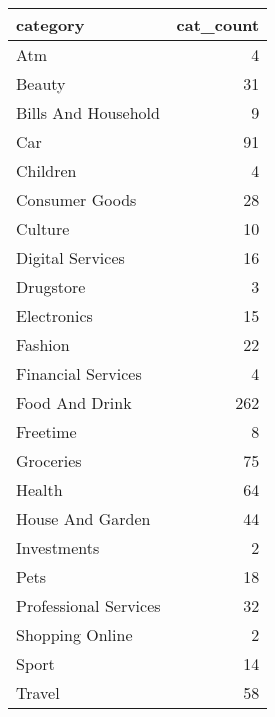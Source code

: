 \begin{tabular}{lr}
\toprule
             category &  cat\_count \\
\midrule
                  Atm &          4 \\
               Beauty &         31 \\
  Bills And Household &          9 \\
                  Car &         91 \\
             Children &          4 \\
       Consumer Goods &         28 \\
              Culture &         10 \\
     Digital Services &         16 \\
            Drugstore &          3 \\
          Electronics &         15 \\
              Fashion &         22 \\
   Financial Services &          4 \\
       Food And Drink &        262 \\
             Freetime &          8 \\
            Groceries &         75 \\
               Health &         64 \\
     House And Garden &         44 \\
          Investments &          2 \\
                 Pets &         18 \\
Professional Services &         32 \\
      Shopping Online &          2 \\
                Sport &         14 \\
               Travel &         58 \\
\bottomrule
\end{tabular}
